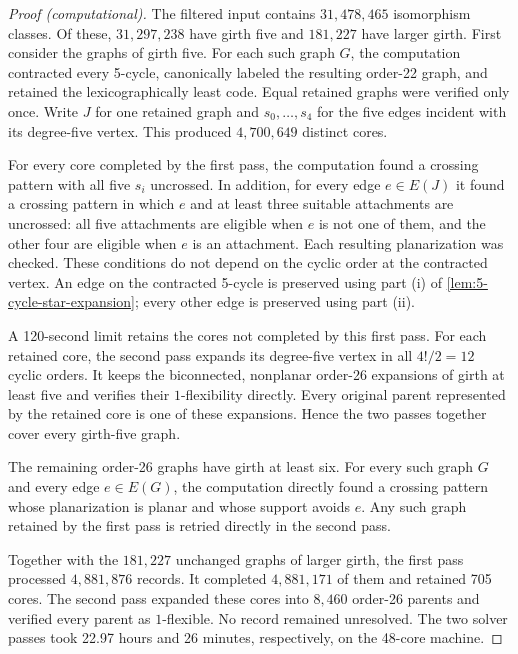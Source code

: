 \documentclass[a4paper,11pt]{article}
\theoremstyle{plain}
\theoremstyle{definition}  %
\begin{document}
\begin{proof}[Proof (computational)]
    The filtered input contains $31{,}478{,}465$ isomorphism classes.  Of
    these, $31{,}297{,}238$ have girth five and $181{,}227$ have larger girth.
    First consider the graphs of girth five.  For each such graph $G$, the
    computation contracted every 5-cycle, canonically labeled the resulting
    order-22 graph, and retained the lexicographically least code.  Equal
    retained graphs were verified only once.  Write $J$ for one retained
    graph and $s_0,\ldots,s_4$ for the five edges incident with its
    degree-five vertex.  This produced $4{,}700{,}649$ distinct cores.

    For every core completed by the first pass, the computation found a
    crossing pattern with all five $s_i$ uncrossed.  In addition, for every
    edge $e\in E(J)$ it found a crossing pattern in which $e$ and at least
    three suitable attachments are uncrossed: all five attachments are
    eligible when $e$ is not one of them, and the other four are eligible
    when $e$ is an attachment.  Each resulting planarization was checked.
    These conditions do not depend on the cyclic order at the contracted
    vertex.  An edge on the contracted 5-cycle is preserved using part (i)
    of \cref{lem:5-cycle-star-expansion}; every other edge is preserved using
    part (ii).

    A 120-second limit retains the cores not completed by this first pass.
    For each retained core, the second pass expands its degree-five vertex in
    all \(4!/2=12\) cyclic orders.  It keeps the biconnected, nonplanar
    order-26 expansions of girth at least five and verifies their
    \(1\)-flexibility directly.  Every original parent represented by the
    retained core is one of these expansions.  Hence the two passes together
    cover every girth-five graph.

    The remaining order-26 graphs have girth at least six.  For every such
    graph $G$ and every edge $e\in E(G)$, the computation directly found a
    crossing pattern whose planarization is planar and whose support avoids
    $e$.  Any such graph retained by the first pass is retried
    directly in the second pass.

    Together with the $181{,}227$ unchanged graphs of larger girth, the first
    pass processed $4{,}881{,}876$ records.  It completed $4{,}881{,}171$ of
    them and retained 705 cores.  The second pass expanded these cores into
    $8{,}460$ order-26 parents and verified every parent as $1$-flexible.  No
    record remained unresolved.  The two solver passes took 22.97 hours and
    26 minutes, respectively, on the 48-core machine.
\end{proof}
\end{document}
